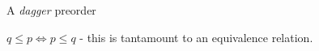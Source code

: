 
A \emph{dagger} preorder

$q \leq p \iff p \leq q$ - this is tantamount to an equivalence relation.